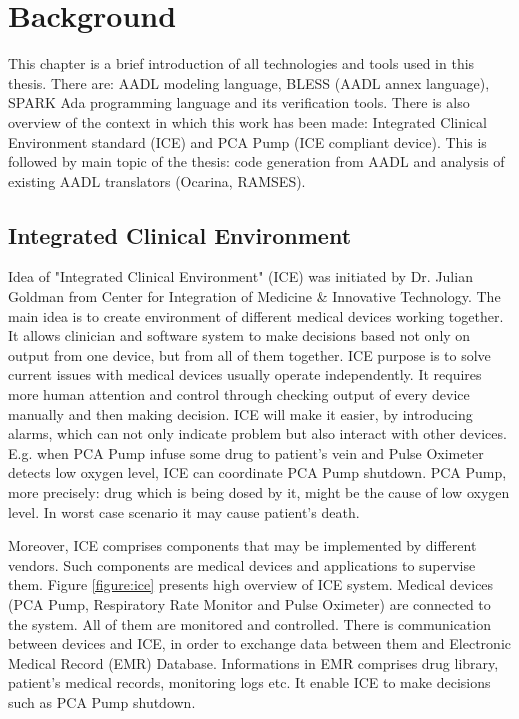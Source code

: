 
\cleardoublepage


\chapter{Background}
\label{background}

This chapter is a brief introduction of all technologies and tools used in this thesis. There are: AADL modeling language, BLESS (AADL annex language), SPARK Ada programming language and its verification tools. There is also overview of the context in which this work has been made: Integrated Clinical Environment standard (ICE) and PCA Pump (ICE compliant device). This is followed by main topic of the thesis: code generation from AADL and analysis of existing AADL translators (Ocarina, RAMSES).



\section{Integrated Clinical Environment}
\label{background:ice}

Idea of "Integrated Clinical Environment" (ICE) was initiated by Dr. Julian Goldman from Center for Integration of Medicine \& Innovative Technology. The main idea is to create environment of different medical devices working together. It allows clinician and software system to make decisions based not only on output from one device, but from all of them together. ICE purpose is to solve current issues with medical devices usually operate independently. It requires more human attention and control through checking output of every device manually and then making decision. ICE will make it easier, by introducing alarms, which can not only indicate problem but also interact with other devices. E.g. when PCA Pump infuse some drug to patient's vein and Pulse Oximeter detects low oxygen level, ICE can coordinate PCA Pump shutdown. PCA Pump, more precisely: drug which is being dosed by it, might be the cause of low oxygen level. In worst case scenario it may cause patient's death.

Moreover, ICE comprises components that may be implemented by different vendors. Such components are medical devices and applications to supervise them. Figure \ref{figure:ice} presents high overview of ICE system. Medical devices (PCA Pump, Respiratory Rate Monitor and Pulse Oximeter) are connected to the system. All of them are monitored and controlled. There is communication between devices and ICE, in order to exchange data between them and Electronic Medical Record (EMR) Database. Informations in EMR comprises drug library, patient's medical records, monitoring logs etc. It enable ICE to make decisions such as PCA Pump shutdown.

